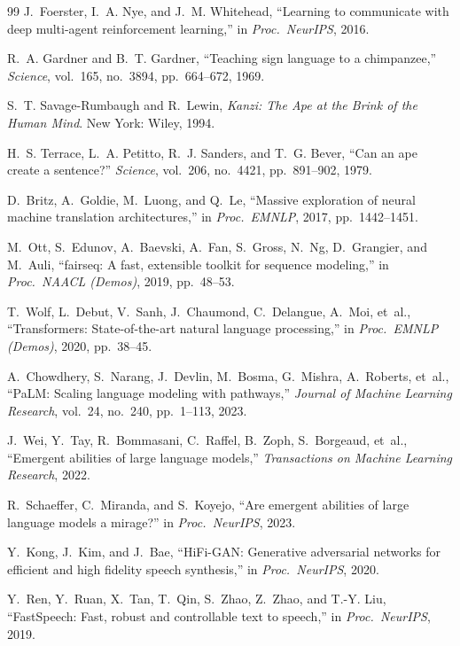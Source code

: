 \begin{thebibliography}{99}
J.~Foerster, I.~A. Nye, and J.~M. Whitehead, ``Learning to communicate with
deep multi-agent reinforcement learning,'' in \emph{Proc.\ NeurIPS}, 2016.

R.~A. Gardner and B.~T. Gardner, ``Teaching sign language to a
chimpanzee,'' \emph{Science}, vol.~165, no.~3894, pp.~664--672, 1969.

S.~T. Savage-Rumbaugh and R.~Lewin, \emph{Kanzi: The Ape at the Brink of the
Human Mind}. New York: Wiley, 1994.

H.~S. Terrace, L.~A. Petitto, R.~J. Sanders, and T.~G. Bever, ``Can an ape
create a sentence?'' \emph{Science}, vol.~206, no.~4421, pp.~891--902, 1979.

D.~Britz, A.~Goldie, M.~Luong, and Q.~Le, ``Massive exploration of neural
machine translation architectures,'' in \emph{Proc.\ EMNLP}, 2017,
pp.~1442--1451.

M.~Ott, S.~Edunov, A.~Baevski, A.~Fan, S.~Gross, N.~Ng, D.~Grangier, and
M.~Auli, ``fairseq: A fast, extensible toolkit for sequence modeling,'' in
\emph{Proc.\ NAACL (Demos)}, 2019, pp.~48--53.

T.~Wolf, L.~Debut, V.~Sanh, J.~Chaumond, C.~Delangue, A.~Moi, et~al.,
``Transformers: State-of-the-art natural language processing,'' in
\emph{Proc.\ EMNLP (Demos)}, 2020, pp.~38--45.

A.~Chowdhery, S.~Narang, J.~Devlin, M.~Bosma, G.~Mishra, A.~Roberts, et~al.,
``PaLM: Scaling language modeling with pathways,'' \emph{Journal of Machine
Learning Research}, vol.~24, no.~240, pp.~1--113, 2023.

J.~Wei, Y.~Tay, R.~Bommasani, C.~Raffel, B.~Zoph, S.~Borgeaud, et~al.,
``Emergent abilities of large language models,'' \emph{Transactions on
Machine Learning Research}, 2022.

R.~Schaeffer, C.~Miranda, and S.~Koyejo, ``Are emergent abilities of large
language models a mirage?'' in \emph{Proc.\ NeurIPS}, 2023.

Y.~Kong, J.~Kim, and J.~Bae, ``HiFi-GAN: Generative adversarial networks for
efficient and high fidelity speech synthesis,'' in \emph{Proc.\ NeurIPS}, 2020.

Y.~Ren, Y.~Ruan, X.~Tan, T.~Qin, S.~Zhao, Z.~Zhao, and T.-Y. Liu,
``FastSpeech: Fast, robust and controllable text to speech,'' in
\emph{Proc.\ NeurIPS}, 2019.


\end{thebibliography}
